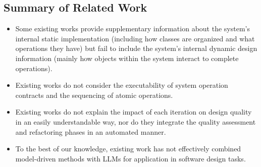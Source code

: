 \documentclass[pdflatex,sn-mathphys-num]{sn-jnl}%
\theoremstyle{thmstyleone}%
\theoremstyle{thmstyletwo}%
\theoremstyle{thmstylethree}%
\begin{document}
\subsection{Summary of Related Work}

\begin{itemize}
    \item Some existing works provide supplementary information about the system's internal static implementation (including how classes are organized and what operations they have) but fail to include the system's internal dynamic design information (mainly how objects within the system interact to complete operations).
    \item Existing works do not consider the executability of system operation contracts and the sequencing of atomic operations.
    \item Existing works do not explain the impact of each iteration on design quality in an easily understandable way, nor do they integrate the quality assessment and refactoring phases in an automated manner.
    \item To the best of our knowledge, existing work has not effectively combined model-driven methods with LLMs for application in software design tasks.
\end{itemize}
\end{document}
